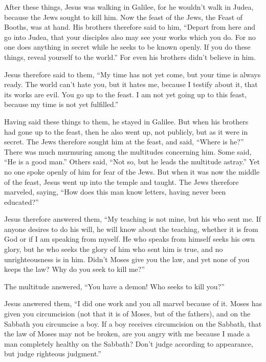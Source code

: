  After these things, Jesus was walking in Galilee, for he
wouldn't walk in Judea, because the Jews sought to kill him.
 Now the feast of the Jews, the Feast of Booths, was at
hand.  His brothers therefore said to him, ``Depart from
here and go into Judea, that your disciples also may see your works
which you do.  For no one does anything in secret while he
seeks to be known openly. If you do these things, reveal yourself to the
world.''  For even his brothers didn't believe in him.

 Jesus therefore said to them, ``My time has not yet come,
but your time is always ready.  The world can't hate you,
but it hates me, because I testify about it, that its works are evil.
 You go up to the feast. I am not yet going up to this
feast, because my time is not yet fulfilled.''

 Having said these things to them, he stayed in Galilee.
 But when his brothers had gone up to the feast, then he
also went up, not publicly, but as it were in secret.  The
Jews therefore sought him at the feast, and said, ``Where is he?''
 There was much murmuring among the multitudes concerning
him. Some said, ``He is a good man.'' Others said, ``Not so, but he
leads the multitude astray.''  Yet no one spoke openly of
him for fear of the Jews.  But when it was now the middle
of the feast, Jesus went up into the temple and taught. 
The Jews therefore marveled, saying, ``How does this man know letters,
having never been educated?''

 Jesus therefore answered them, ``My teaching is not mine,
but his who sent me.  If anyone desires to do his will, he
will know about the teaching, whether it is from God or if I am speaking
from myself.  He who speaks from himself seeks his own
glory, but he who seeks the glory of him who sent him is true, and no
unrighteousness is in him.  Didn't Moses give you the law,
and yet none of you keeps the law? Why do you seek to kill me?''

 The multitude answered, ``You have a demon! Who seeks to
kill you?''

 Jesus answered them, ``I did one work and you all marvel
because of it.  Moses has given you circumcision (not that
it is of Moses, but of the fathers), and on the Sabbath you circumcise a
boy.  If a boy receives circumcision on the Sabbath, that
the law of Moses may not be broken, are you angry with me because I made
a man completely healthy on the Sabbath?  Don't judge
according to appearance, but judge righteous judgment.''

